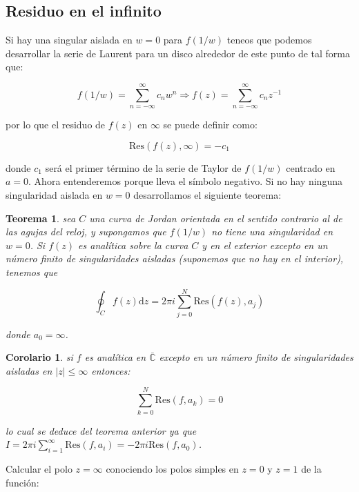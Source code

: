 \documentclass[12pt]{book}
\newcommand{\D}{\mathrm{d}}
\newcommand{\Res}{\mathrm{Res}}
\newtheorem{theorem}{Teorema}[section]
\newtheorem{corollary}{Corolario}[theorem]
\begin{document}
\subsection{Residuo en el infinito}

Si hay una singular aislada en $w=0$ para $f(1/w)$ teneos que podemos desarrollar la serie de Laurent para un disco alrededor de este punto de tal forma que:

$$f(1/w) = \sum_{n= -\infty }^{\infty} c_n w^n \Longrightarrow f(z) = \sum_{n= -\infty }^{\infty} c_n z^{-1}$$

por lo que el residuo de $f(z)$ en $\infty$ se puede definir como:

\begin{equation}
\Res  (f(z), \infty) = - c_1
\end{equation}

donde $c_1$ será el primer término de la serie de Taylor de $f(1/w)$ centrado en $a=0$. Ahora entenderemos porque lleva el símbolo negativo. Si no hay ninguna singularidad aislada en $w=0$ desarrollamos el siguiente teorema:

\begin{theorem}
sea $C$ una curva de Jordan orientada en el sentido contrario al de las agujas del reloj, y supongamos que $f(1/w)$ no tiene una singularidad en $w=0$. Si $f(z)$ es analítica sobre la curva $C$ y en el exterior excepto en un número finito de singularidades aisladas (suponemos que no hay en el interior), tenemos que

$$ \oint_C f(z) \D z = 2 \pi i \sum_{j=0}^N \Res (f(z),a_j) $$

donde $a_0 = \infty$.
\end{theorem}

\begin{corollary}
si  $f$ es analítica en $\bar{\mathbb{C}}$ excepto en un número finito de singularidades aisladas en $|z| \leq  \infty$ entonces:

$$ \sum_{k=0}^N \Res  (f,a_k) = 0 $$

lo cual se deduce del teorema anterior ya que $I=2 \pi i\sum_{i=1}^{\infty} \Res (f,a_i) = - 2 \pi i \Res(f,a_0)$. 

\end{corollary}





\hrulefill


Calcular el polo $z=\infty$ conociendo los polos simples en $z=0$ y $z=1$ de la función:
\end{document}
